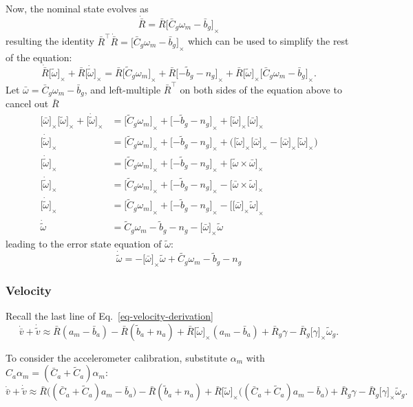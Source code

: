 \documentclass[letter,10pt]{article}
\newcommand{\asym}[1]{{\lbrack #1\rbrack}_\times{}}
\begin{document}
Now, the nominal state evolves as
$$
\dot{\bar R} = \bar R\asym{\bar C_g \omega_m - \bar b_g}
$$
resulting the identity $\bar R^\top \dot{\bar R} = \asym{\bar C_g \omega_m - \bar b_g}$ which can be used to simplify the rest of the equation:
$$
\dot{\bar R}\asym{\tilde\omega} + \bar R\asym{\dot{\tilde\omega}} =
  \bar R\asym{\tilde C_g\omega_m} + \bar R\asym{-\tilde b_g - n_g}  
    + \bar R \asym{\tilde \omega}\asym{\bar C_g\omega_m-\bar b_g}.
$$
Let $\bar\omega=\bar C_g \omega_m - \bar b_g$, and left-multiple $\bar R^\top$ on both sides of the equation above to cancel out $\bar R$
\begin{align}
\asym{\bar\omega}\asym{\tilde\omega} + \asym{\dot{\tilde\omega}} &=
  \asym{\tilde C_g\omega_m} + \asym{-\tilde b_g - n_g}  
    + \asym{\tilde \omega}\asym{\bar\omega} \\
\asym{\dot{\tilde\omega}} &=
  \asym{\tilde C_g\omega_m} + \asym{-\tilde b_g - n_g}  
    + \big(\asym{\tilde\omega}\asym{\bar\omega}-\asym{\bar\omega}\asym{\tilde\omega}\big) \\
\asym{\dot{\tilde\omega}} &=
  \asym{\tilde C_g\omega_m} + \asym{-\tilde b_g - n_g}  
    + \asym{\tilde\omega\times\bar\omega} \\
\asym{\dot{\tilde\omega}} &=
  \asym{\tilde C_g\omega_m} + \asym{-\tilde b_g - n_g}  
    - \asym{\bar\omega\times\tilde\omega} \\
\asym{\dot{\tilde\omega}} &=
  \asym{\tilde C_g\omega_m} + \asym{-\tilde b_g - n_g}  
    - \asym{\asym{\bar\omega}\tilde\omega} \\
\dot{\tilde\omega} &= \tilde C_g\omega_m - \tilde b_g - n_g - \asym{\bar\omega}\tilde\omega
\end{align}
leading to the error state equation of $\tilde\omega$:
$$
\dot{\tilde\omega} = -\asym{\bar\omega}\tilde{\omega} + \tilde{C_g} \omega_m - \tilde b_g - n_g
$$


\subsubsection{Velocity}

Recall the last line of Eq.~\eqref{eq-velocity-derivation}
$$
 \dot{\bar v} + \dot{\tilde v} \approx \bar R (a_m-\bar b_a) -\bar R (\tilde b_a + n_a) + \bar R \asym{\tilde\omega}(a_m-\bar b_a) + \bar R_g \gamma - \bar R_g \asym{\gamma}\tilde\omega_g.
$$

To consider the accelerometer calibration, substitute $\alpha_m$ with $C_a\alpha_m=(\bar C_a+\tilde C_a)\alpha_m$:
$$
 \dot{\bar v} + \dot{\tilde v} \approx \bar R \big((\bar C_a + \tilde C_a)a_m-\bar b_a\big) -\bar R (\tilde b_a + n_a) + \bar R \asym{\tilde\omega}\big((\bar C_a + \tilde C_a) a_m-\bar b_a\big) + \bar R_g \gamma - \bar R_g \asym{\gamma}\tilde\omega_g.
$$
\end{document}
